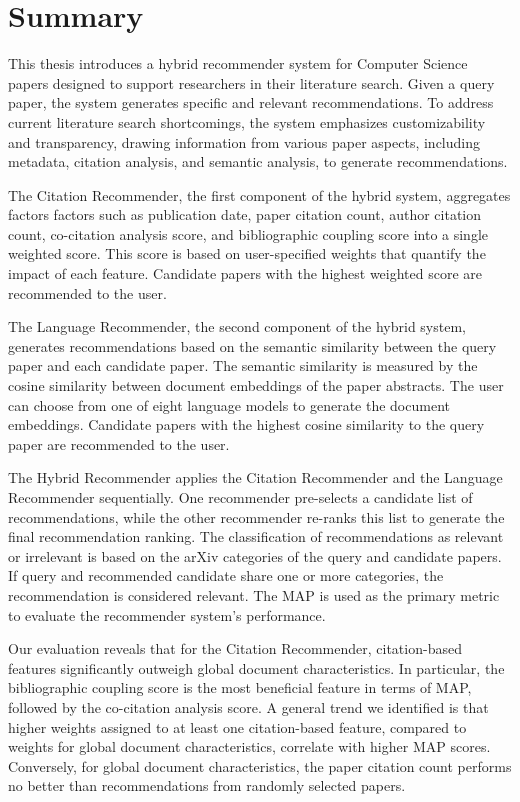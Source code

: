 \section{Summary} \label{sec:summary}

This thesis introduces a hybrid recommender system for Computer Science papers designed to support researchers in their literature search. Given a query paper, the system generates specific and relevant recommendations.
To address current literature search shortcomings, the system emphasizes customizability and transparency, drawing information from various paper aspects,
including metadata, citation analysis, and semantic analysis, to generate recommendations.

The Citation Recommender, the first component of the hybrid system, aggregates factors factors such as publication date, paper citation count, author citation count, co-citation analysis score, and bibliographic coupling score into a single weighted score. This score is based on user-specified weights that quantify the impact of each feature. Candidate papers with the highest weighted score are recommended to the user.

The Language Recommender, the second component of the hybrid system, generates recommendations based on the semantic similarity between the query paper and each candidate paper. The semantic similarity is measured by the cosine similarity between document embeddings of the paper abstracts. The user can choose from one of eight language models to generate the document embeddings. Candidate papers with the highest cosine similarity to the query paper are recommended to the user.

The Hybrid Recommender applies the Citation Recommender and the Language Recommender sequentially. One recommender pre-selects a candidate list of recommendations, while the other recommender re-ranks this list to generate the final recommendation ranking.
The classification of recommendations as relevant or irrelevant is based on the arXiv categories of the query and candidate papers. If query and recommended candidate share one or more categories, the recommendation is considered relevant. The \ac{MAP} is used as the primary metric to evaluate the recommender system's performance.

Our evaluation reveals that for the Citation Recommender, citation-based features significantly outweigh global document characteristics.
In particular, the bibliographic coupling score is the most beneficial feature in terms of \ac{MAP}, followed by the co-citation analysis score.
A general trend we identified is that higher weights assigned to at least one citation-based feature, compared to weights for global document characteristics, correlate with higher \ac{MAP} scores.
Conversely, for global document characteristics, the paper citation count performs no better than recommendations from randomly selected papers.

